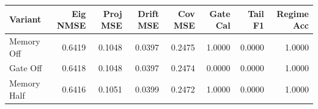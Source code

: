 \begin{tabular}{lrrrrrrr}
\toprule
Variant & Eig NMSE & Proj MSE & Drift MSE & Cov MSE & Gate Cal & Tail F1 & Regime Acc \\
\midrule
Memory Off & 0.6419 & 0.1048 & 0.0397 & 0.2475 & 1.0000 & 0.0000 & 1.0000 \\
Gate Off & 0.6418 & 0.1048 & 0.0397 & 0.2474 & 0.0000 & 0.0000 & 1.0000 \\
Memory Half & 0.6416 & 0.1051 & 0.0399 & 0.2472 & 1.0000 & 0.0000 & 1.0000 \\
\bottomrule
\end{tabular}